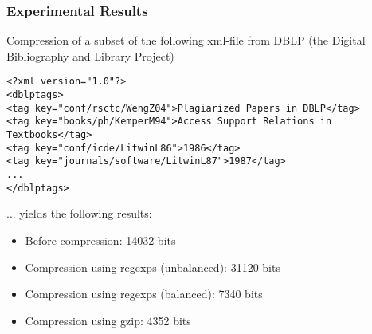\documentclass[slidestop,compress,mathserif, xcolor=table]{beamer}
\begin{document}
\begin{frame}[fragile]
  \frametitle{Experimental Results}

  Compression of a subset of the following xml-file from DBLP (the Digital Bibliography and Library Project)

{\tiny
\begin{verbatim}
<?xml version="1.0"?>
<dblptags>
<tag key="conf/rsctc/WengZ04">Plagiarized Papers in DBLP</tag>
<tag key="books/ph/KemperM94">Access Support Relations in Textbooks</tag>
<tag key="conf/icde/LitwinL86">1986</tag>
<tag key="journals/software/LitwinL87">1987</tag>
...
</dblptags>
\end{verbatim}
} 

  ... yields the following results:

  \begin{itemize}
  \item Before compression: 14032 bits
  \item Compression using regexps (unbalanced): 31120 bits
  \item Compression using regexps (balanced): 7340 bits
  \item Compression using gzip: 4352 bits
  \end{itemize}

\end{frame}


     



  
  
\end{document}
